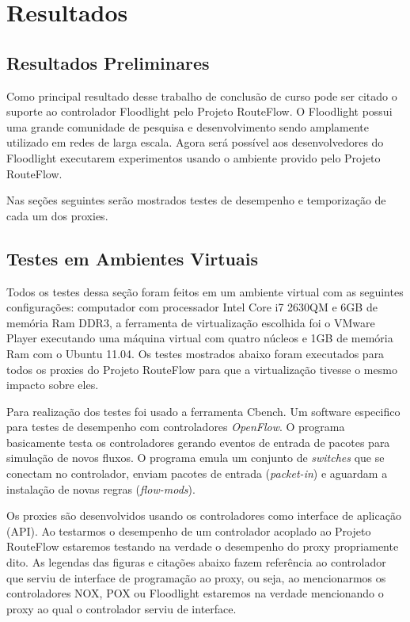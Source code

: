 \chapter{Resultados}

\section{Resultados Preliminares}

Como principal resultado desse trabalho de conclusão de 
curso pode ser citado o suporte ao controlador Floodlight 
pelo Projeto RouteFlow. O Floodlight possui uma grande
comunidade de pesquisa e desenvolvimento sendo 
amplamente utilizado em redes de larga escala. Agora será
possível aos desenvolvedores do Floodlight executarem 
experimentos usando o ambiente provido pelo Projeto
RouteFlow.

Nas seções seguintes serão mostrados testes de desempenho
 e temporização de cada um dos proxies.

\section{Testes em Ambientes Virtuais}

Todos os testes dessa seção foram feitos em um ambiente 
virtual com as seguintes configurações: computador com
processador Intel Core i7 2630QM e 6GB de memória Ram 
DDR3, a ferramenta de virtualização escolhida foi o VMware
 Player executando uma máquina virtual com quatro núcleos 
e 1GB de memória Ram com o Ubuntu 11.04. Os testes 
mostrados abaixo foram executados para
todos os proxies do Projeto RouteFlow para que a 
virtualização tivesse o mesmo impacto sobre eles.

Para realização dos testes foi usado a ferramenta Cbench.
Um software especifico para testes de desempenho com 
controladores \textit{OpenFlow}. O programa basicamente
testa os controladores gerando eventos de entrada de 
pacotes para simulação de novos fluxos. O programa emula
 um conjunto de \textit{switches} que se conectam no 
controlador, enviam pacotes de entrada (\textit{packet-in})
e aguardam a instalação de novas regras (\textit{flow-mods}).

Os proxies são desenvolvidos usando os controladores como
interface de aplicação (API). Ao testarmos o desempenho 
de um controlador acoplado ao Projeto RouteFlow estaremos
testando na verdade o desempenho do proxy propriamente 
dito. As legendas das figuras e citações abaixo fazem
referência ao controlador que serviu de interface de programação
ao proxy, ou seja, ao mencionarmos os controladores NOX,
POX ou Floodlight estaremos na verdade mencionando
o proxy ao qual o controlador serviu de interface. 


